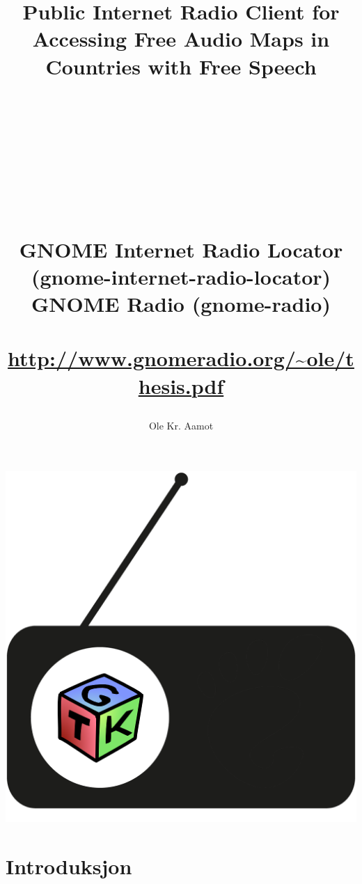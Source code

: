 \documentclass[a4paper,norsk,utf8]{report}
\author{Ole Kr. Aamot}
\title{
 Public Internet Radio Client for Accessing Free Audio Maps in Countries with Free Speech\\\\
 \begin{large}\\
 \\
 \\
 \\
   GNOME Internet Radio Locator (gnome-internet-radio-locator)\\
   GNOME Radio (gnome-radio)\\
 \\
   \url{http://www.gnomeradio.org/~ole/thesis.pdf}
  \end{large}
}
\subtitle{\noindent\begin{small}AAMOT\,\ OLE\ 1978\-02\-20\ OSLO\ METROPOLITAN\ UNIVERSITY\ 2020\-06\-30\ BSc EE\end{small}\\
\noindent\begin{footnotesize}Public Internet Radio Client for Accessing Free Audio Maps in Countries with Free Speech\end{footnotesize}\\
\noindent\begin{footnotesize}GNOME Internet Radio Locator (gnome-internet-radio-locator)\end{footnotesize}\\
\noindent\begin{footnotesize}GNOME Radio (gnome-radio)\end{footnotesize}}
\begin{document}
\maketitle
\begin{center}
\includegraphics[width=1.0\hsize]{thesis.png}
\end{center}
% 
\newpage
\section*{Introduksjon}
\end{document}
